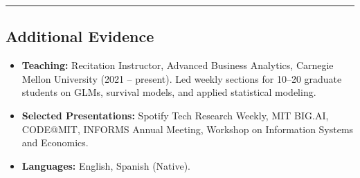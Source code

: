 \documentclass[10pt,letterpaper]{article}
\newcommand{\hsep}{\noindent\textcolor{gray}{\rule{\textwidth}{0.5pt}}}
\newcommand{\block}[1]{\begin{samepage}\hsep\subsection*{#1}\end{samepage}}
\begin{document}
\block{Additional Evidence}

\begin{itemize}[leftmargin=0pt, label={}]
\item \textbf{Teaching:} Recitation Instructor, Advanced Business Analytics, Carnegie Mellon University (2021 -- present). Led weekly sections for 10--20 graduate students on GLMs, survival models, and applied statistical modeling.
\item \textbf{Selected Presentations:} Spotify Tech Research Weekly, MIT BIG.AI, CODE@MIT, INFORMS Annual Meeting, Workshop on Information Systems and Economics.
\item \textbf{Languages:} English, Spanish (Native).
\end{itemize}
\end{document}
